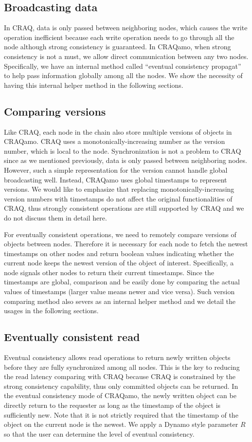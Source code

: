 \subsection{Broadcasting data}
In CRAQ, data is only passed between neighboring nodes, which causes the write operation inefficient because each write operation needs to go through all the node although strong consistency is guaranteed. In CRAQamo, when strong consistency is not a must, we allow direct communication between any two nodes. Specifically, we have an internal method called ``eventual consistency propagat'' to help pass information globally among all the nodes. We show the necessity of having this internal helper method in the following sections.

\subsection{Comparing versions}
Like CRAQ, each node in the chain also store multiple versions of objects in CRAQamo. CRAQ uses a monotonically-increasing number as the version number, which is local to the node. Synchronization is not a problem to CRAQ since as we mentioned previously, data is only passed between neighboring nodes. However, such a simple representation for the version cannot handle global broadcasting well. Instead, CRAQamo uses global timestamps to represent versions. We would like to emphasize that replacing monotonically-increasing version numbers with timestamps do not affect the original functionalities of CRAQ, thus strongly consistent operations are still supported by CRAQ and we do not discuss them in detail here.

For eventually consistent operations, we need to remotely compare versions of objects between nodes. Therefore it is necessary for each node to fetch the newest timestamps on other nodes and return boolean values indicating whether the current node keeps the newest version of the object of interest. Specifically, a node signals other nodes to return their current timestamps. Since the timestamps are global, comparison and be easily done by comparing the actual values of timestamps (larger value means newer and vice versa). Such version comparing method also severs as an internal helper method and we detail the usages in the following sections. 

\subsection{Eventually consistent read}
Eventual consistency allows read operations to return newly written objects before they are fully synchronized among all nodes. This is the key to reducing the read latency comparing with CRAQ because CRAQ is constrained by the strong consistency capability, thus only committed objects can be returned. In the eventual consistency mode of CRAQamo, the newly written object can be directly return to the requester as long as the timestamp of the object is sufficiently new. Note that it is not strictly required that the timestamp of the object on the current node is the newest. We apply a Dynamo style parameter $R$ so that the user can determine the level of eventual consistency.

